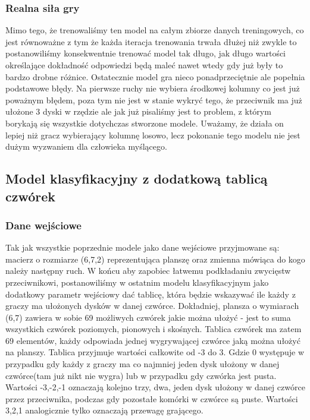 \documentclass[12pt]{article}
\begin{document}
\subsubsection{Realna siła gry}

Mimo tego, że trenowaliśmy ten model na całym zbiorze danych treningowych, co jest równoważne z tym że każda iteracja trenowania trwała dłużej niż zwykle to postanowiliśmy konsekwentnie trenować model tak długo, jak długo wartości określające dokładność odpowiedzi będą maleć nawet wtedy gdy już były to bardzo drobne różnice. Ostatecznie model gra nieco ponadprzeciętnie ale popełnia podstawowe błędy. Na pierwsze ruchy nie wybiera środkowej kolumny co jest już poważnym błędem, poza tym nie jest w stanie wykryć tego, że przeciwnik ma już ułożone 3 dyski w rzędzie ale jak już pisaliśmy jest to problem, z którym borykają się wszystkie dotychczas stworzone modele. Uważamy, że działa on lepiej niż gracz wybierający kolumnę losowo, lecz pokonanie tego modelu nie jest dużym wyzwaniem dla człowieka myślącego.

\subsection{Model klasyfikacyjny z dodatkową tablicą czwórek}

\subsubsection{Dane wejściowe}

Tak jak wszystkie poprzednie modele jako dane wejściowe przyjmowane są: macierz o rozmiarze (6,7,2) reprezentująca planszę oraz zmienna mówiąca do kogo należy następny ruch. W końcu aby zapobiec łatwemu podkładaniu zwycięstw przeciwnikowi, postanowiliśmy w ostatnim modelu klasyfikacyjnym jako dodatkowy parametr wejściowy dać tablicę, która będzie wskazywać ile każdy z graczy ma ułożonych dysków w danej czwórce. Dokładniej, plansza o wymiarach (6,7) zawiera w sobie 69 możliwych czwórek jakie można ułożyć - jest to suma wszystkich czwórek poziomych, pionowych i skośnych. Tablica czwórek ma zatem 69 elementów, każdy odpowiada jednej wygrywającej czwórce jaką można ułożyć na planszy. Tablica przyjmuje wartości całkowite od -3 do 3. Gdzie 0 występuje w przypadku gdy każdy z graczy ma co najmniej jeden dysk ułożony w danej czwórce(tam już nikt nie wygra) lub w przypadku gdy czwórka jest pusta. Wartości -3,-2,-1 oznaczają kolejno trzy, dwa, jeden dysk ułożony w danej czwórce przez przeciwnika, podczas gdy pozostałe komórki w czwórce są puste. Wartości 3,2,1 analogicznie tylko oznaczają przewagę grającego.
\end{document}
